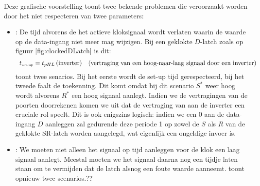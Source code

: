 Deze grafische voorstelling toont twee bekende problemen die veroorzaakt worden door het niet respecteren van twee parameters:
\begin{itemize}
 \item {}: De tijd alvorens de het actieve kloksignaal wordt verlaten waarin de waarde op de data-ingang niet meer mag wijzigen. Bij een geklokte $D$-latch zoals op figuur \ref{fig:clockedDLatch} is dit:
\begin{equation}
\begin{array}{cr}
t_{\mbox{\tiny{set-up}}}=t_{pHL}\left(\mbox{inverter}\right)&\mbox{(vertraging van een hoog-naar-laag signaal door een inverter)}
\end{array}
\end{equation}
 toont twee senarios. Bij het eerste wordt de set-up tijd gerespecteerd, bij het tweede faalt de toekenning. Dit komt omdat bij dit scenario $S^*$ weer hoog wordt alvorens $R^*$ een hoog signaal aanlegt. Indien we de vertragingen van de poorten doorrekenen komen we uit dat de vertraging van aan de inverter een cruciale rol speelt. Dit is ook enigszins logisch: indien we een 0 aan de data-ingang $D$ aanleggen zal gedurende deze periode 1 op zowel de $S$ als $R$ van de geklokte SR-latch worden aangelegd, wat eigenlijk een ongeldige invoer is.
 \item {}: We moeten niet alleen het signaal op tijd aanleggen voor de klok een laag signaal aanlegt. Meestal moeten we het signaal daarna nog een tijdje laten staan om te vermijden dat de latch alsnog een foute waarde aanneemt.  toont opnieuw twee scenarios.??%
\end{itemize}
